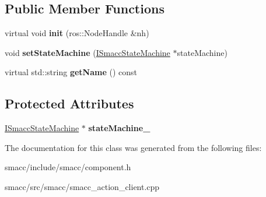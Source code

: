 \subsection*{Public Member Functions}
\begin{DoxyCompactItemize}
\item 
\hypertarget{classsmacc_1_1ISmaccComponent_a2463ed9d3a5ccf167f9596a38671ace0}{virtual void {\bfseries init} (ros\-::\-Node\-Handle \&nh)}\label{classsmacc_1_1ISmaccComponent_a2463ed9d3a5ccf167f9596a38671ace0}

\item 
\hypertarget{classsmacc_1_1ISmaccComponent_afe57665a6982475e8f9c2a5885e986e1}{void {\bfseries set\-State\-Machine} (\hyperlink{classsmacc_1_1ISmaccStateMachine}{I\-Smacc\-State\-Machine} $\ast$state\-Machine)}\label{classsmacc_1_1ISmaccComponent_afe57665a6982475e8f9c2a5885e986e1}

\item 
\hypertarget{classsmacc_1_1ISmaccComponent_aa314809a7fd3516461e31cc120d0cfe7}{virtual std\-::string {\bfseries get\-Name} () const }\label{classsmacc_1_1ISmaccComponent_aa314809a7fd3516461e31cc120d0cfe7}

\end{DoxyCompactItemize}
\subsection*{Protected Attributes}
\begin{DoxyCompactItemize}
\item 
\hypertarget{classsmacc_1_1ISmaccComponent_ae3f37acc1679f79299b86872d4b1f80f}{\hyperlink{classsmacc_1_1ISmaccStateMachine}{I\-Smacc\-State\-Machine} $\ast$ {\bfseries state\-Machine\-\_\-}}\label{classsmacc_1_1ISmaccComponent_ae3f37acc1679f79299b86872d4b1f80f}

\end{DoxyCompactItemize}


The documentation for this class was generated from the following files\-:\begin{DoxyCompactItemize}
\item 
smacc/include/smacc/component.\-h\item 
smacc/src/smacc/smacc\-\_\-action\-\_\-client.\-cpp\end{DoxyCompactItemize}
